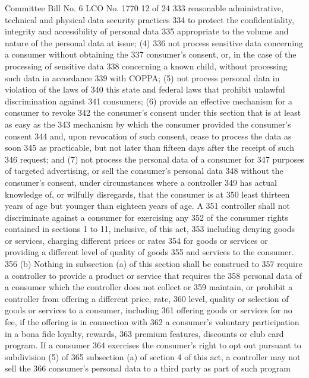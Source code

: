 Committee Bill No. 6
LCO No. 1770 12 of 24
333 reasonable administrative, technical and physical data security practices
334 to protect the confidentiality, integrity and accessibility of personal data
335 appropriate to the volume and nature of the personal data at issue; (4)
336 not process sensitive data concerning a consumer without obtaining the
337 consumer's consent, or, in the case of the processing of sensitive data
338 concerning a known child, without processing such data in accordance
339 with COPPA; (5) not process personal data in violation of the laws of
340 this state and federal laws that prohibit unlawful discrimination against
341 consumers; (6) provide an effective mechanism for a consumer to revoke
342 the consumer's consent under this section that is at least as easy as the
343 mechanism by which the consumer provided the consumer's consent
344 and, upon revocation of such consent, cease to process the data as soon
345 as practicable, but not later than fifteen days after the receipt of such
346 request; and (7) not process the personal data of a consumer for
347 purposes of targeted advertising, or sell the consumer's personal data
348 without the consumer's consent, under circumstances where a controller
349 has actual knowledge of, or wilfully disregards, that the consumer is at
350 least thirteen years of age but younger than eighteen years of age. A
351 controller shall not discriminate against a consumer for exercising any
352 of the consumer rights contained in sections 1 to 11, inclusive, of this act,
353 including denying goods or services, charging different prices or rates
354 for goods or services or providing a different level of quality of goods
355 and services to the consumer.
356 (b) Nothing in subsection (a) of this section shall be construed to
357 require a controller to provide a product or service that requires the
358 personal data of a consumer which the controller does not collect or
359 maintain, or prohibit a controller from offering a different price, rate,
360 level, quality or selection of goods or services to a consumer, including
361 offering goods or services for no fee, if the offering is in connection with
362 a consumer's voluntary participation in a bona fide loyalty, rewards,
363 premium features, discounts or club card program. If a consumer
364 exercises the consumer's right to opt out pursuant to subdivision (5) of
365 subsection (a) of section 4 of this act, a controller may not sell the
366 consumer's personal data to a third party as part of such program 

